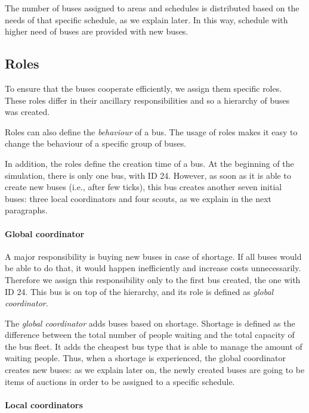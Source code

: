 The number of buses assigned to areas and schedules is distributed based on the needs of that specific schedule, as we explain later. In this way, schedule with higher need of buses are provided with new buses.

\subsection{Roles}
\label{subsec:roles}

To ensure that the buses cooperate efficiently, we assign them specific roles. These roles differ in their ancillary responsibilities and so a hierarchy of buses was created.

Roles can also define the \textit{behaviour} of a bus. The usage of roles makes it easy to change the behaviour of a specific group of buses.

In addition, the roles define the creation time of a bus. At the beginning of the simulation, there is only one bus, with ID 24. However, as soon as it is able to create new buses (i.e., after few ticks), this bus creates another seven initial buses: three local coordinators and four scouts, as we explain in the next paragraphs.

\paragraph{Global coordinator}

A major responsibility is buying new buses in case of shortage. If all buses would be able to do that, it would happen inefficiently and increase costs unnecessarily. Therefore we assign this responsibility only to the first bus created, the one with ID 24. This bus is on top of the hierarchy, and its role is defined as \textit{global coordinator}. 

The \textit{global coordinator} adds buses based on shortage. Shortage is defined as the difference between the total number of people waiting and the total capacity of the bus fleet. It adds the cheapest bus type that is able to manage the amount of waiting people. Thus, when a shortage is experienced, the global coordinator creates new buses: as we explain later on, the newly created buses are going to be items of auctions in order to be assigned to a specific schedule.

\paragraph{Local coordinators}

